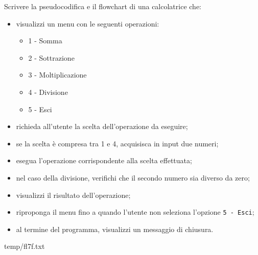 \documentclass[11pt,fleqn]{book}
\begin{document}
\begin{esercizio}[3]
    Scrivere la pseudocodifica e il flowchart di una calcolatrice che: 
     \begin{itemize} [labelsep=0.3cm]
        \item visualizzi un menu con le seguenti
         operazioni: 
         \begin{itemize}[labelsep=0.3cm]
            \item 1 - Somma 
            \item 2 - Sottrazione 
            \item 3 - Moltiplicazione 
            \item 4 - Divisione 
            \item 5 - Esci \end{itemize} 
            \item richieda all'utente la scelta dell'operazione da eseguire; 
            \item se la scelta è compresa tra 1 e 4, acquisisca in input due numeri; 
            \item esegua l'operazione corrispondente alla scelta effettuata; 
            \item nel caso della divisione, verifichi che il secondo numero sia diverso da zero; 
            \item visualizzi il risultato dell'operazione; 
            \item riproponga il menu fino a quando l'utente non seleziona l'opzione \texttt{5 - Esci}; 
            \item al termine del programma, visualizzi un messaggio di chiusura. 
    \end{itemize}
    
    \ifsoluzioni
        \solution

        \begin{filecontents*}{temp/fl7f.txt}
        
        \end{filecontents*}

        \immediate{}
        
        \newpage

        \immediate{}
        
        \newpage
    \fi
\end{esercizio}

\newpage
\end{document}
